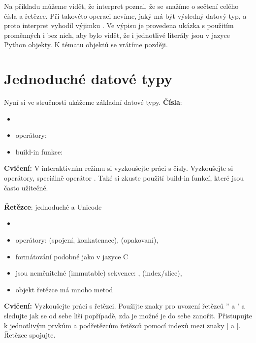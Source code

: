 Na příkladu můžeme vidět, že interpret poznal, že se snažíme o sečtení celého čísla a řetězce. Při takovéto operaci nevíme, jaký má být
výsledný datový typ, a proto interpret vyhodil výjimku .
Ve výpisu je provedena ukázka s použitím proměnných i bez nich, aby bylo vidět, že i jednotlivé literály jsou v jazyce Python objekty. K tématu objektů se vrátíme později.

\section{Jednoduché datové typy}

Nyní si ve stručnosti ukážeme základní datové typy.
\newline
\newline
\noindent
\textbf{Čísla}: 
\begin{itemize}
    \item {}
    \item operátory: \kod{+ - * ** / // \% \texttildelow $\,$ \& | $<<$ $>>$}
    \item build-in funkce: 
\end{itemize}

\noindent
{\textbf{Cvičení:}}
V interaktivním režimu si vyzkoušejte práci s čísly. Vyzkoušejte si operátory, speciálně operátor \kod{**}. Také si zkuste použití build-in
funkcí, které jsou často užitečné.
\\
\\
\noindent
\textbf{Řetězce}: jednoduché a Unicode
\begin{itemize}
    \item {}
    \item operátory: \kod{+} (spojení, konkatenace), \kod{*} (opakovaní), 
    \item formátování podobné jako v jazyce C
    \item jsou neměnitelné (immutable) sekvence: , \kod{[ ]} (index/slice), 
    \item objekt řetězce má mnoho metod
\end{itemize}

\noindent
{\textbf{Cvičení:}}
Vyzkoušejte práci s řetězci. Použijte znaky pro uvození řetězců '' a ' a sledujte jak se od sebe liší popřípadě, zda je možné je do sebe zanořit. Přistupujte k jednotlivým prvkům a podřetězcům řetězců pomocí indexů mezi znaky $[$ a $]$. Řetězce spojujte.

